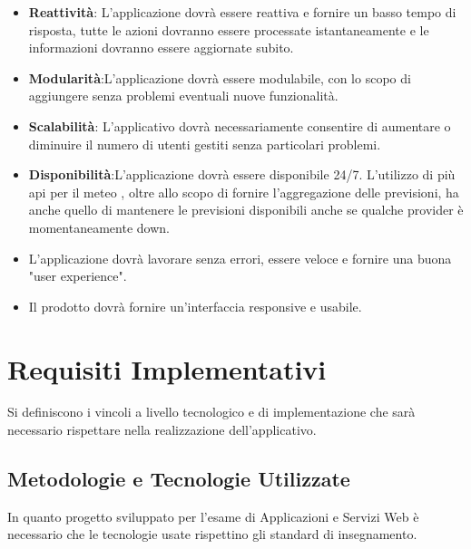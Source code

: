             \begin{itemize}
                \item \textbf{Reattività}: L'applicazione dovrà essere reattiva e fornire un basso tempo di risposta, tutte le azioni dovranno essere processate istantaneamente e le informazioni dovranno essere aggiornate subito.
                \item \textbf{Modularità}:L'applicazione dovrà essere modulabile, con lo scopo di aggiungere senza problemi eventuali nuove funzionalità.
                \item \textbf{Scalabilità}: L'applicativo dovrà necessariamente consentire di aumentare o diminuire il numero di utenti gestiti senza particolari problemi. 
                \item \textbf{Disponibilità}:L'applicazione dovrà essere disponibile 24/7. L'utilizzo di più api per il meteo , oltre allo scopo di fornire l'aggregazione delle previsioni, ha anche quello di mantenere le previsioni disponibili anche se qualche provider è momentaneamente down.
                \item L'applicazione dovrà lavorare senza errori, essere veloce e fornire una buona "user experience".
                	\item Il prodotto dovrà fornire un'interfaccia responsive e usabile.
            \end{itemize}
        

	\section{Requisiti Implementativi}
	Si definiscono i vincoli a livello tecnologico e di implementazione che sarà necessario rispettare nella realizzazione dell'applicativo.
	
	\subsection{Metodologie e Tecnologie Utilizzate}
	In quanto progetto sviluppato per l'esame di Applicazioni e Servizi Web è necessario che le tecnologie usate rispettino gli standard di insegnamento. 
	